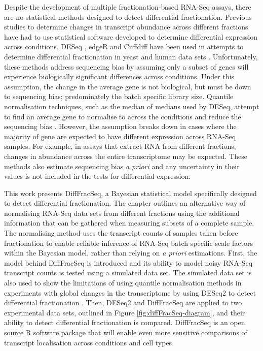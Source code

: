 \documentclass[../main.tex]{subfiles}
\begin{document}
Despite the development of multiple fractionation-based RNA-Seq assays, there are no statistical methods designed to detect differential fractionation.
Previous studies to determine changes in transcript abundance across different fractions have had to use statistical software developed to determine differential expression across conditions. 
DESeq \parencite{Anders2010}, edgeR \parencite{Robinson2010} and Cuffdiff \parencite{Trapnell2010} have been used in attempts to determine differential fractionation in yeast and human data sets \parencite{Khong2017, Matheny2019, VanTreeck2018, Hubstenberger2017}. 
Unfortunately, these methods address sequencing bias by assuming only a subset of genes will experience biologically significant differences across conditions. 
Under this assumption, the change in the average gene is not biological, but must be down to sequencing bias; predominately the batch specific library size.
Quantile normalisation techniques, such as the median of medians used by DESeq, attempt to find an average gene to normalise to across the conditions and reduce the sequencing bias \parencite{Anders2010}.
However, the assumption breaks down in cases where the majority of gene are expected to have different expression across RNA-Seq samples. 
For example, in assays that extract RNA from different fractions, changes in abundance across the entire transcriptome may be expected.
These methods also estimate sequencing bias \textit{a priori} and any uncertainty in their values is not included in the tests for differential expression.


This work presents DiffFracSeq, a Bayesian statistical model specifically designed to detect differential fractionation.
The chapter outlines an alternative way of normalising RNA-Seq data sets from different fractions using the additional information that can be gathered when measuring subsets of a complete sample.
The normalising method uses the transcript counts of samples taken before fractionation to enable reliable inference of RNA-Seq batch specific scale factors within the Bayesian model, rather than relying on \textit{a priori} estimations.
First, the model behind DiffFracSeq is introduced and its ability to model noisy RNA-Seq transcript counts is tested using a simulated data set. 
The simulated data set is also used to show the limitations of using quantile normalisation methods in experiments with global changes in the transcriptome by using DESeq2 to detect differential fractionation \parencite{Love2014}.
Then, DESeq2 and DiffFracSeq are applied to two experimental data sets, outlined in Figure \ref{fig:diffFracSeq-diagram}, and their ability to detect differential fractionation is compared.
DiffFracSeq is an open source R software package that will enable even more sensitive comparisons of transcript localisation across conditions and cell types.
\end{document}
